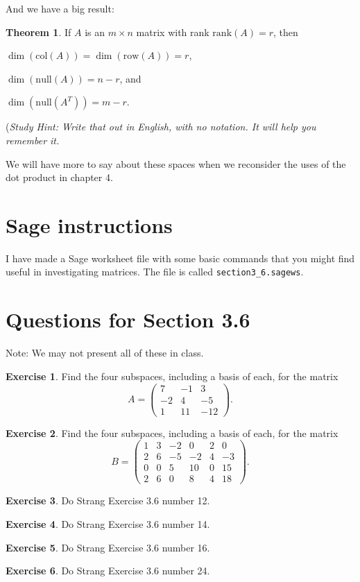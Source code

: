 \documentclass[11pt]{amsart}
\theoremstyle{definition}
\newtheorem{exercise}{Exercise}
\newtheorem*{theorem}{Theorem}
\begin{document}
And we have a big result:

\begin{theorem}
If $A$ is an $m\times n$ matrix with rank $\mathrm{rank}(A) = r$, then
\begin{compactitem}
\item $\dim(\mathrm{col}(A)) = \dim(\mathrm{row}(A)) = r$,
\item $\dim(\mathrm{null}(A)) = n-r$, and
\item $\dim(\mathrm{null}(A^T))= m-r$.
\end{compactitem}
\end{theorem}

(\emph{Study Hint: Write that out in English, with no notation. It will help you remember it.}

We will have more to say about these spaces when we reconsider the uses of the dot product in chapter 4.

\section{Sage instructions}

I have made a Sage worksheet file with some basic commands that you might find useful in investigating matrices. The file is called \texttt{section3\_6.sagews}.


\section{Questions for Section 3.6}
\setcounter{exercise}{110}

Note: We may not present all of these in class.

\begin{exercise} Find the four subspaces, including a basis of each, for the matrix
\[
A = \begin{pmatrix}
7 & -1 & 3 \\
-2 & 4 & -5 \\
1 & 11 & -12
\end{pmatrix}.
\]
\end{exercise}
\begin{exercise} Find the four subspaces, including a basis of each, for the matrix
\[
B = \begin{pmatrix}
1 & 3 & -2 & 0 & 2 & 0 \\
2 & 6 & -5 & -2 & 4 & -3 \\
0 & 0 & 5 & 10 & 0 & 15 \\
2 & 6 & 0 & 8 & 4 & 18
\end{pmatrix}.
\] \end{exercise}
\begin{exercise} Do Strang Exercise 3.6 number 12. \end{exercise}
\begin{exercise} Do Strang Exercise 3.6 number 14. \end{exercise}
\begin{exercise} Do Strang Exercise 3.6 number 16. \end{exercise}
\begin{exercise} Do Strang Exercise 3.6 number 24. \end{exercise}
\end{document}
